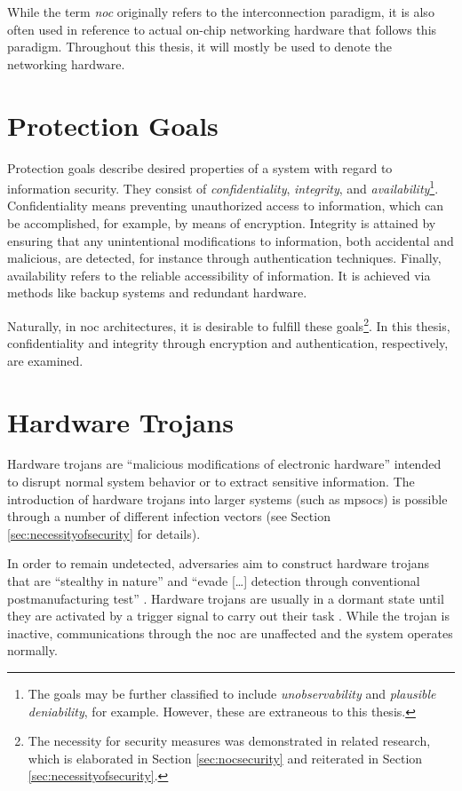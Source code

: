 While the term \textit{\gls{noc}} originally refers to the interconnection paradigm, it is also often used in reference to actual on-chip networking
hardware that follows this paradigm. Throughout this thesis, it will mostly be used to denote the networking hardware.

\section{Protection Goals}\label{sec:protectiongoals}
Protection goals describe desired properties of a system with regard to information security. They consist of \textit{confidentiality},
\textit{integrity}, and \textit{availability}\footnote{The goals may be further classified to include \textit{unobservability} and \textit{plausible
deniability}, for example. However, these are extraneous to this thesis.}. Confidentiality means preventing unauthorized access to information, which
can be accomplished, for example, by means of encryption. Integrity is attained by ensuring that any unintentional modifications to information, both accidental and
malicious, are detected, for instance through authentication techniques. Finally, availability refers to the reliable accessibility of information. It is
achieved via methods like backup systems and redundant hardware.

Naturally, in \gls{noc} architectures, it is desirable to fulfill these goals\footnote{The necessity for security measures was demonstrated in
related research, which is elaborated in Section \ref{sec:nocsecurity} and reiterated in Section \ref{sec:necessityofsecurity}.}. In this thesis,
confidentiality and integrity through encryption and authentication, respectively, are examined.

\section{Hardware Trojans}\label{sec:hardwaretrojans}
Hardware trojans are \enquote{malicious modifications of electronic hardware} \cite[1]{bhunia14hardwaretrojans} intended to disrupt normal
system behavior or to extract sensitive information. The introduction of hardware trojans into larger systems (such as \glspl{mpsoc}) is possible
through a number of different infection vectors (see Section \ref{sec:necessityofsecurity} for details).

In order to remain undetected, adversaries aim to construct hardware trojans that are \enquote{stealthy in nature} \cite[1]{bhunia14hardwaretrojans}
and \enquote{evade […] detection through conventional postmanufacturing test} \cite[1]{bhunia14hardwaretrojans}. Hardware trojans are usually in a
dormant state until they are activated by a trigger signal to carry out their task \cites{bhunia14hardwaretrojans}{ancajas14fortnocs}. While the
trojan is inactive, communications through the \gls{noc} are unaffected and the system operates normally.

